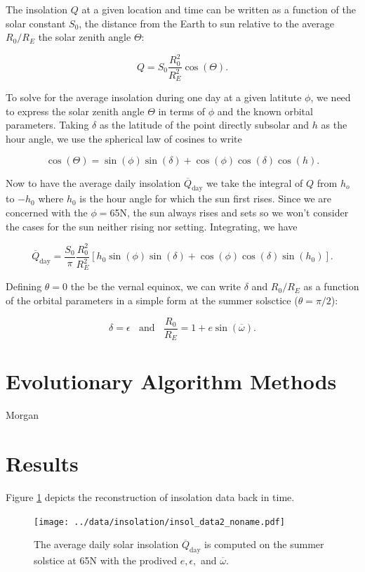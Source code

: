 The insolation $Q$ at a given location and time can be written as a function of the solar constant $S_0$, the distance from the Earth to sun relative to the average $R_0/R_E$ the solar zenith angle $\Theta$:

$$ Q = S_0 \frac{R_0^2}{R_E^2} \cos (\Theta) .$$

To solve for the average insolation during one day at a given latitute $\phi$, we need to express the solar zenith angle $\Theta$ in terms of $\phi$ and the known orbital parameters.
Taking $\delta$ as the latitude of the point directly subsolar and $h$ as the hour angle, we use the spherical law of cosines to write

$$ \cos ( \Theta ) = \sin ( \phi ) \sin ( \delta ) + \cos ( \phi ) \cos ( \delta ) \cos ( h ) .$$

Now to have the average daily insolation $\overline{Q} _\text{day}$ we take the integral of $Q$ from $h_o $ to $-h_0$ where $h_0$ is the hour angle for which the sun first rises.
Since we are concerned with the $\phi = $65N, the sun always rises and sets so we won't consider the cases for the sun neither rising nor setting.
Integrating, we have

$$ \overline{Q} _\text{day} = \frac{S_0}{\pi } \frac{R_0^2}{R_E^2} \left [ h_0 \sin (\phi) \sin (\delta) + \cos (\phi) \cos (\delta) \sin (h_0) \right ] . $$

Defining $\theta = 0$ the be the vernal equinox, we can write $\delta$ and $R_0/R_E$ as a function of the orbital parameters in a simple form at the summer solsctice ($\theta = \pi /2$):

$$ \delta = \epsilon ~~~~\text{and} ~~~~ \frac{R_0}{R_E} = 1 + e\sin (\overline {\omega}) .$$

\section{Evolutionary Algorithm Methods}



Morgan

\section{Results}

Figure \ref{fig:insol-data} depicts the reconstruction of insolation data back in time.

\begin{figure}[tpb!]
\centering
  \texttt{[image: ../data/insolation/insol\_data2\_noname.pdf]}
  \caption{
    The average daily solar insolation $\overline{Q}_{\text{day}}$ is computed on the summer solstice at 65N with the prodived $e,\epsilon,$ and $\overline{\omega}$.
  }
  \label{fig:insol-data}
\end{figure}

